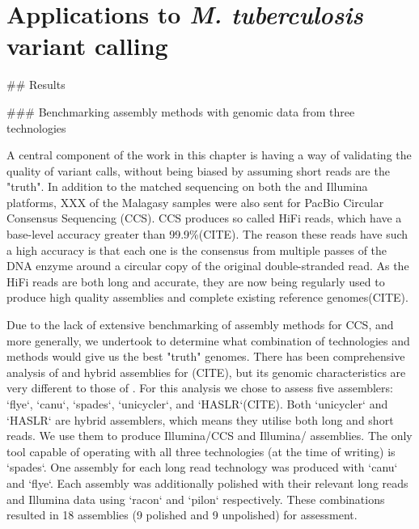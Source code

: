 
\chapter{Applications to \textit{M. tuberculosis} \ont{} variant calling}

\ifpdf
    \graphicspath{{Chapter2/Figs/Raster/}{Chapter2/Figs/PDF/}{Chapter2/Figs/}}
\else
    \graphicspath{{Chapter2/Figs/Vector/}{Chapter2/Figs/}}
\fi

\begin{markdown}


## Results

### Benchmarking assembly methods with genomic data from three technologies \label{sec:asm_results}

A central component of the work in this chapter is having a way of validating the quality of variant calls, without being biased by assuming short reads are the "truth". In addition to the matched sequencing on both the \ont{} and Illumina platforms, XXX of the Malagasy samples were also sent for PacBio Circular Consensus Sequencing (CCS). CCS produces so called HiFi reads, which have a base-level accuracy greater than 99.9\%(CITE). The reason these reads have such a high accuracy is that each one is the consensus from multiple passes of the DNA enzyme around a circular copy of the original double-stranded read. As the HiFi reads are both long and accurate, they are now being regularly used to produce high quality \denovo{} assemblies and complete existing reference genomes(CITE).  

Due to the lack of extensive benchmarking of assembly methods for CCS, and \mtb{} more generally, we undertook to determine what combination of technologies and methods would give us the best "truth" genomes. There has been comprehensive analysis of \ont{} and hybrid assemblies for \ecoli{}(CITE), but its genomic characteristics are very different to those of \mtb{}. For this analysis we chose to assess five assemblers: `flye`, `canu`, `spades`, `unicycler`, and `HASLR`(CITE). Both `unicycler` and `HASLR` are hybrid assemblers, which means they utilise both long and short reads. We use them to produce Illumina/CCS and Illumina/\ont{} assemblies. The only tool capable of operating with all three technologies (at the time of writing) is `spades`. One assembly for each long read technology was produced with `canu` and `flye`.  
Each assembly was additionally polished with their relevant long reads and Illumina data using `racon` and `pilon` respectively. These combinations resulted in 18 assemblies (9 polished and 9 unpolished) for assessment.  


\end{markdown}
